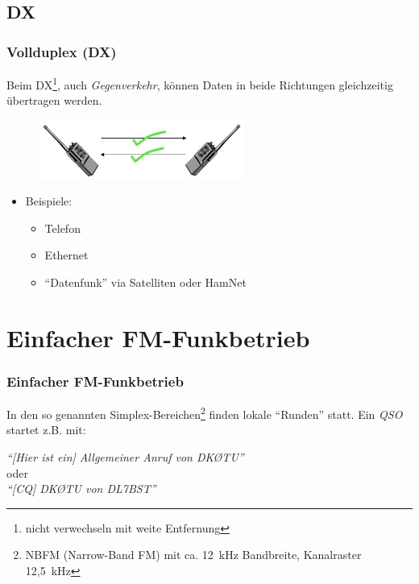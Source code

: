 \subsection{DX}

\begin{frame}
  \frametitle{Vollduplex (DX)}

  Beim DX\footnote{nicht verwechseln mit weite Entfernung}, auch
  \emph{Gegenverkehr}, können Daten in beide Richtungen gleichzeitig
  übertragen werden. \\[1em]

  \begin{center}
    \begin{figure}
      \includegraphics[width=0.6\textwidth,height=.25\textheight,keepaspectratio]{bv11/FullDuplex.jpg}
    \end{figure}
  \end{center}

  \begin{itemize}
    \item Beispiele:

      \begin{itemize}
        \item Telefon
        \item Ethernet
        \item ``Datenfunk'' via Satelliten oder HamNet
      \end{itemize}
  \end{itemize}

\end{frame}

\section[FM-Funkbetrieb]{Einfacher FM-Funkbetrieb}

\begin{frame}
  \frametitle{Einfacher FM-Funkbetrieb}

  In den so genannten Simplex-Bereichen\footnote{NBFM (Narrow-Band FM) mit ca. 12~kHz
  Bandbreite, Kanalraster 12,5~kHz} finden lokale ``Runden'' statt.
  Ein \emph{QSO} startet z.B. mit: \\[2em]

  \begin{center}
    \Large \emph{``[Hier ist ein] Allgemeiner Anruf von DKØTU''} \\[1em]
    \normalsize oder \\[1em]
    \Large \emph{``[CQ] DKØTU von DL7BST''}
  \end{center}

\end{frame}

